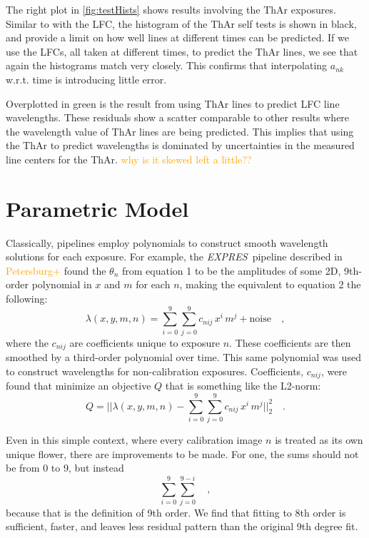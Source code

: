 \documentclass[12pt, letterpaper]{article}
\newcommand{\lz}[1]{\textcolor{orange}{#1}}
\newcommand{\project}[1]{\textsl{#1}}
\newcommand{\acronym}[1]{{\small{#1}}}
\newcommand{\expres}{\project{\acronym{EXPRES}}}
\begin{document}
The right plot in \ref{fig:testHists} shows results involving the ThAr exposures.  Similar to with the LFC, the histogram of the ThAr self tests is shown in black, and provide a limit on how well lines at different times can be predicted.  If we use the LFCs, all taken at different times, to predict the ThAr lines, we see that again the histograms match very closely.  This confirms that interpolating $a_{nk}$ w.r.t. time is introducing little error.

Overplotted in green is the result from using ThAr lines to predict LFC line wavelengths.  These residuals show a scatter comparable to other results where the wavelength value of ThAr lines are being predicted.  This implies that using the ThAr to predict wavelengths is dominated by uncertainties in the measured line centers for the ThAr.
\lz{why is it skewed left a little??}

\section{Parametric Model} \label{sec:comparisons}
Classically, pipelines employ polynomials to construct smooth wavelength solutions for each exposure.  For example, the \expres\ pipeline described in \lz{Petersburg+} found the $\theta_{n}$ from equation 1 to be the amplitudes of some 2D, 9th-order polynomial in $x$ and $m$ for each $n$, making the equivalent to equation 2 the following:
\begin{equation}
\lambda(x,y,m,n) = \sum_{i=0}^9\sum_{j=0}^9 c_{nij}\, x^i\,m^j + \mathrm{noise}
\quad ,
\end{equation}
where the $c_{nij}$ are coefficients unique to exposure $n$.  These coefficients are then smoothed by a third-order polynomial over time.  This same polynomial was used to construct wavelengths for non-calibration exposures.
Coefficients, $c_{nij}$, were found that minimize an objective $Q$ that is something like the L2-norm:
\begin{equation}
Q = ||\lambda(x,y,m,n) - \sum_{i=0}^9\sum_{j=0}^9 c_{nij}\, x^i\,m^j||_2^2
\quad .
\end{equation}

Even in this simple context, where every calibration image $n$ is treated as its own unique flower, there are improvements to be made.
For one, the sums should not be from 0 to 9, but instead
\begin{equation}
\sum_{i=0}^9\sum_{j=0}^{9-i}
\quad ,
\end{equation}
because that is the definition of 9th order.  We find that fitting to 8th order is sufficient, faster, and leaves less residual pattern than the original 9th degree fit.
\end{document}
